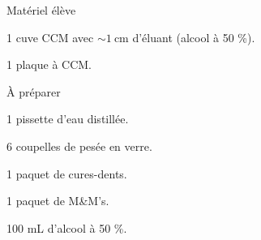 
\begin{boiteMateriel}{Matériel élève}
  \effectifSeconde
  
  \begin{protocole}
    \item 1 cuve CCM avec $\sim \qty{1}{\cm}$ d'éluant (alcool à 50 \%).
    \item 1 plaque à CCM.
  \end{protocole}
\end{boiteMateriel}


\begin{boiteMateriel}{À préparer}
  \begin{protocole}
    \item 1 pissette d'eau distillée.
    \item 6 coupelles de pesée en verre.
    \item 1 paquet de cures-dents.
    \item 1 paquet de M\&M's.
    \item 100 mL d'alcool à 50 \%.
  \end{protocole}
\end{boiteMateriel}